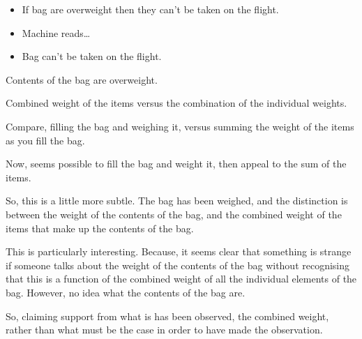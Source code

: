 \begin{note}

  \begin{illustration}
    \mbox{}
    \vspace{-\baselineskip}
    \begin{itemize}
    \item If bag are overweight then they can't be taken on the flight.
    \item Machine reads\dots
    \item Bag can't be taken on the flight.
    \end{itemize}
  \end{illustration}
  Contents of the bag are overweight.

  Combined weight of the items versus the combination of the individual weights.

  Compare, filling the bag and weighing it, versus summing the weight of the items as you fill the bag.

  Now, seems possible to fill the bag and weight it, then appeal to the sum of the items.

  So, this is a little more subtle.
  The bag has been weighed, and the distinction is between the weight of the contents of the bag, and the combined weight of the items that make up the contents of the bag.

  This is particularly interesting.
  Because, it seems clear that something is strange if someone talks about the weight of the contents of the bag without recognising that this is a function of the combined weight of all the individual elements of the bag.
  However, no idea what the contents of the bag are.

  So, claiming support from what is has been observed, the combined weight, rather than what must be the case in order to have made the observation.
\end{note}

\section{}
\label{sec:foregone-conclusions}

